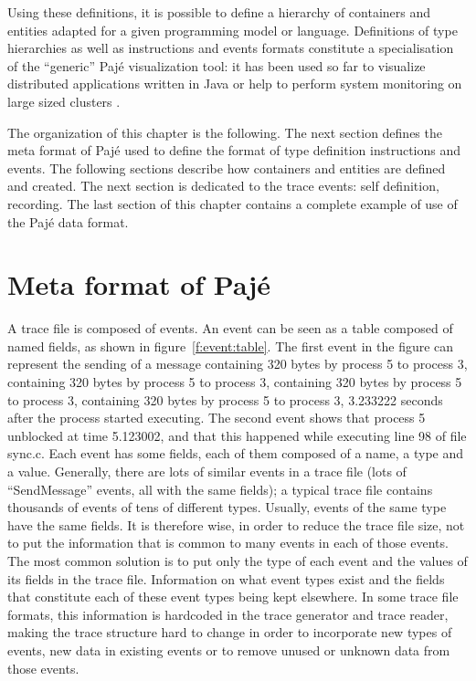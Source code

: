 Using these definitions, it is possible to define a hierarchy of
containers and entities adapted for a given programming model or
language. Definitions of type hierarchies as well as instructions and
events formats constitute a specialisation of the ``generic'' Pajé
visualization tool: it has been used so far to visualize distributed
applications written in Java \cite{OttogaliOSCV:2001} or help to
perform system monitoring on large sized clusters
\cite{GuilloudCAS:2001}. 

The organization of this chapter is the following. The next section
defines the meta format of Pajé used to define the format of type
definition instructions and events. The following sections describe
how containers and entities are defined and created. The next section
is dedicated to the trace events: self definition, recording. The last
section of this chapter contains a complete example of use of the Pajé
data format.

\section{Meta format of Pajé}
\label{sec:file}

A trace file is composed of events.
An event can be seen as a table composed of named fields, as shown in figure~\ref{f:event:table}. 
The first event in the figure can represent the sending of a message containing 320 bytes by process 5 to process 3, containing 320 bytes by process 5 to process 3, containing 320 bytes by process 5 to process 3, containing 320 bytes by process 5 to process 3, 3.233222 seconds after the process started executing.
The second event shows that process 5 unblocked at time 5.123002, and that this happened while executing line 98 of file sync.c.
Each event has some fields, each of them composed of a name, a type and a value. Generally, there are lots of similar events in a trace file (lots of ``SendMessage'' events, all with the same fields); a typical trace file contains thousands of events of tens of different types.
Usually, events of the same type have the same fields.
It is therefore wise, in order to reduce the trace file size, not to put the
information that is common to many events in each of those events.
The most common solution is to put only the type of each event and the values of its fields in the trace file. Information on what event types exist and the fields that constitute each of these event types being kept elsewhere.
In some trace file formats, this information is hardcoded in the trace generator and trace reader, making the trace structure hard to change in order to incorporate new types of events, new data in existing events or to remove unused or unknown data from those events.


